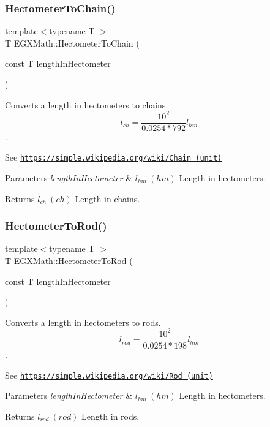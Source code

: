 \subsubsection{\texorpdfstring{Hectometer\+To\+Chain()}{HectometerToChain()}}
{\footnotesize\ttfamily template$<$typename T $>$ \\
T E\+G\+X\+Math\+::\+Hectometer\+To\+Chain (\begin{DoxyParamCaption}\item[{const T}]{length\+In\+Hectometer }\end{DoxyParamCaption})}



Converts a length in hectometers to chains. \[ l_{ch}= \frac{10^{2}}{0.0254 * 792} l_{hm} \]. 

See \href{https://simple.wikipedia.org/wiki/Chain_(unit)}{\tt https\+://simple.\+wikipedia.\+org/wiki/\+Chain\+\_\+(unit)} 
\begin{DoxyParams}{Parameters}
{\em length\+In\+Hectometer} & $ l_{hm}\ (hm)$ Length in hectometers. \\
\hline
\end{DoxyParams}
\begin{DoxyReturn}{Returns}
$ l_{ch}\ (ch)$ Length in chains. 
\end{DoxyReturn}
\mbox{\label{group___e_g_x_math-_conversions-_length_conversions-_s_i-_hectometer-_surveyors_gafdf1df626e4b3c88f88bd3d6d3545e7d}} 
\subsubsection{\texorpdfstring{Hectometer\+To\+Rod()}{HectometerToRod()}}
{\footnotesize\ttfamily template$<$typename T $>$ \\
T E\+G\+X\+Math\+::\+Hectometer\+To\+Rod (\begin{DoxyParamCaption}\item[{const T}]{length\+In\+Hectometer }\end{DoxyParamCaption})}



Converts a length in hectometers to rods. \[ l_{rod}= \frac{10^{2}}{0.0254 * 198} l_{hm} \]. 

See \href{https://simple.wikipedia.org/wiki/Rod_(unit)}{\tt https\+://simple.\+wikipedia.\+org/wiki/\+Rod\+\_\+(unit)} 
\begin{DoxyParams}{Parameters}
{\em length\+In\+Hectometer} & $ l_{hm}\ (hm)$ Length in hectometers. \\
\hline
\end{DoxyParams}
\begin{DoxyReturn}{Returns}
$ l_{rod}\ (rod)$ Length in rods. 
\end{DoxyReturn}
